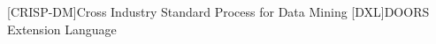 
\begin{acronym}
	[CRISP-DM]{Cross Industry Standard Process for Data Mining}
	[DXL]{DOORS Extension Language}
\end{acronym}


